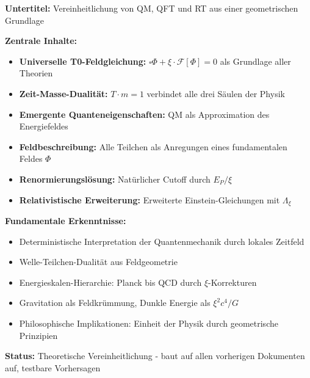 	\begin{documentbox}
		\textbf{Untertitel:} Vereinheitlichung von QM, QFT und RT aus einer geometrischen Grundlage
		
		\textbf{Zentrale Inhalte:}
		\begin{itemize}
			\item \textbf{Universelle T0-Feldgleichung:} $\square \Phi + \xi \cdot \mathcal{F}[\Phi] = 0$ als Grundlage aller Theorien
			\item \textbf{Zeit-Masse-Dualität:} $T \cdot m = 1$ verbindet alle drei Säulen der Physik
			\item \textbf{Emergente Quanteneigenschaften:} QM als Approximation des Energiefeldes
			\item \textbf{Feldbeschreibung:} Alle Teilchen als Anregungen eines fundamentalen Feldes $\Phi$
			\item \textbf{Renormierungslösung:} Natürlicher Cutoff durch $E_P/\xi$
			\item \textbf{Relativistische Erweiterung:} Erweiterte Einstein-Gleichungen mit $\Lambda_{\xi}$
		\end{itemize}
		
		\textbf{Fundamentale Erkenntnisse:}
		\begin{itemize}
			\item Deterministische Interpretation der Quantenmechanik durch lokales Zeitfeld
			\item Welle-Teilchen-Dualität aus Feldgeometrie
			\item Energieskalen-Hierarchie: Planck bis QCD durch $\xi$-Korrekturen
			\item Gravitation als Feldkrümmung, Dunkle Energie als $\xi^2 c^4 / G$
			\item Philosophische Implikationen: Einheit der Physik durch geometrische Prinzipien
		\end{itemize}
		
		\textbf{Status:} Theoretische Vereinheitlichung - baut auf allen vorherigen Dokumenten auf, testbare Vorhersagen
	\end{documentbox}
